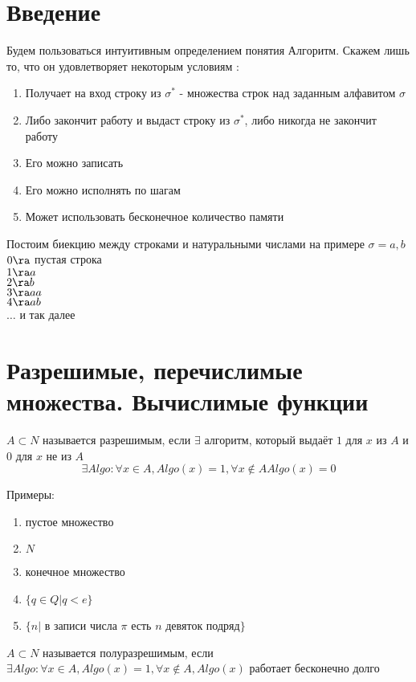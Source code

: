 \section{Введение}
Будем пользоваться интуитивным определением понятия $Алгоритм$. Скажем лишь то, что он удовлетворяет некоторым условиям :
\begin{enumerate}
    \item Получает на вход строку из $\sigma^*$ - множества строк над заданным алфавитом $\sigma$
    \item Либо закончит работу и выдаст строку из $\sigma^*$, либо никогда не закончит работу
    \item Его можно записать
    \item Его можно исполнять по шагам
    \item Может использовать бесконечное количество памяти
\end{enumerate}

Постоим биекцию между строками и натуральными числами на примере $\sigma = {a, b}$\\
$0 \ra$ пустая строка\\
$1\ra a$\\
$2\ra b$\\
$3\ra aa$\\
$4\ra ab$\\
$\dots$ и так далее

\section{Разрешимые, перечислимые множества. Вычислимые функции}

\begin{Def}
	$A \subset N$ называется разрешимым, если $\exists$ алгоритм, который выдаёт $1$ для $x$ из $A$ и $0$ для $x$ не из $A$
	$$\exists Algo \colon \forall x \in A, Algo(x) = 1, \forall x \notin A Algo(x) = 0$$
\end{Def}

Примеры:
\begin{enumerate}
	\item пустое множество
	\item $N$
	\item конечное множество
	\item $\{q \in Q | q < e\}$
	\item $\{n|$ в записи числа $\pi$ есть $n$ девяток подряд$\}$
\end {enumerate}

\begin{Def}
	$A \subset N$ называется полуразрешимым, если
	$\exists Algo \colon \forall x \in A, Algo(x) = 1, \forall x \notin A, Algo(x)$ работает бесконечно долго
\end{Def}

